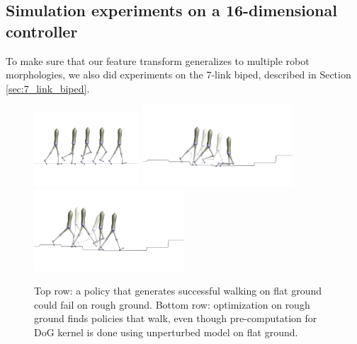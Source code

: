 
\subsection{Simulation experiments on a 16-dimensional controller}
\label{sec:probform}
To make sure that our feature transform generalizes to multiple robot morphologies, we also did experiments on the 7-link biped, described in Section \ref{sec:7_link_biped}.

\begin{figure}[t]
\centering
\includegraphics[width=0.35\textwidth]{img/walk_flat.png}
\hspace{10px}
\vspace{-40px}
\includegraphics[width=0.5\textwidth]{img/rough_fall.png}
\label{fig_bo_locomotion_visualization_rough}
\vspace{30px}
\includegraphics[width=0.5\textwidth]{img/rough_walk.png}
\caption{Top row: a policy that generates successful walking on flat ground could fail on rough ground. Bottom row: optimization on rough ground finds policies that walk, even though pre-computation for DoG kernel is done using unperturbed model on flat ground.}
\label{fig_bo_locomotion_visualization_flat}
\end{figure}

